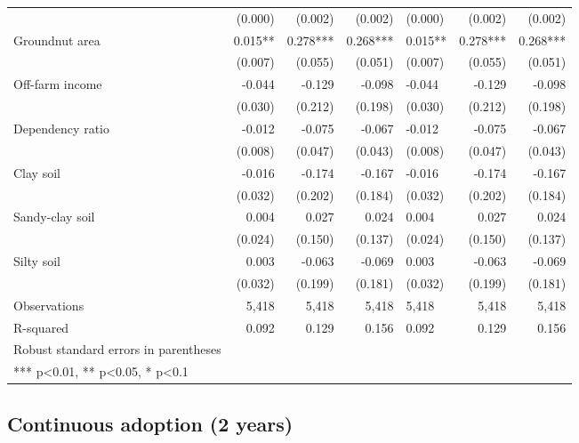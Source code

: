 \documentclass[
]{article}
\begin{document}
\begin{longtable}[t]{lrrrlrr}
 & (0.000) & (0.002) & (0.002) & (0.000) & (0.002) & (0.002)\\
\addlinespace
Groundnut area & 0.015** & 0.278*** & 0.268*** & 0.015** & 0.278*** & 0.268***\\
 & (0.007) & (0.055) & (0.051) & (0.007) & (0.055) & (0.051)\\
Off-farm income & -0.044 & -0.129 & -0.098 & -0.044 & -0.129 & -0.098\\
 & (0.030) & (0.212) & (0.198) & (0.030) & (0.212) & (0.198)\\
Dependency ratio & -0.012 & -0.075 & -0.067 & -0.012 & -0.075 & -0.067\\
\addlinespace
 & (0.008) & (0.047) & (0.043) & (0.008) & (0.047) & (0.043)\\
Clay soil & -0.016 & -0.174 & -0.167 & -0.016 & -0.174 & -0.167\\
 & (0.032) & (0.202) & (0.184) & (0.032) & (0.202) & (0.184)\\
Sandy-clay soil & 0.004 & 0.027 & 0.024 & 0.004 & 0.027 & 0.024\\
 & (0.024) & (0.150) & (0.137) & (0.024) & (0.150) & (0.137)\\
\addlinespace
Silty soil & 0.003 & -0.063 & -0.069 & 0.003 & -0.063 & -0.069\\
 & (0.032) & (0.199) & (0.181) & (0.032) & (0.199) & (0.181)\\
Observations & 5,418 & 5,418 & 5,418 & 5,418 & 5,418 & 5,418\\
R-squared & 0.092 & 0.129 & 0.156 & 0.092 & 0.129 & 0.156\\
Robust standard errors in parentheses &  &  &  &  &  & \\
\addlinespace
*** p<0.01, ** p<0.05, * p<0.1 &  &  &  &  &  & \\*
\end{longtable}
\endgroup{}
\newpage

\hypertarget{continuous-adoption-2-years}{%
\subsection{Continuous adoption (2 years)}\label{continuous-adoption-2-years}}

\begingroup\fontsize{7}{9}\selectfont
\end{document}
